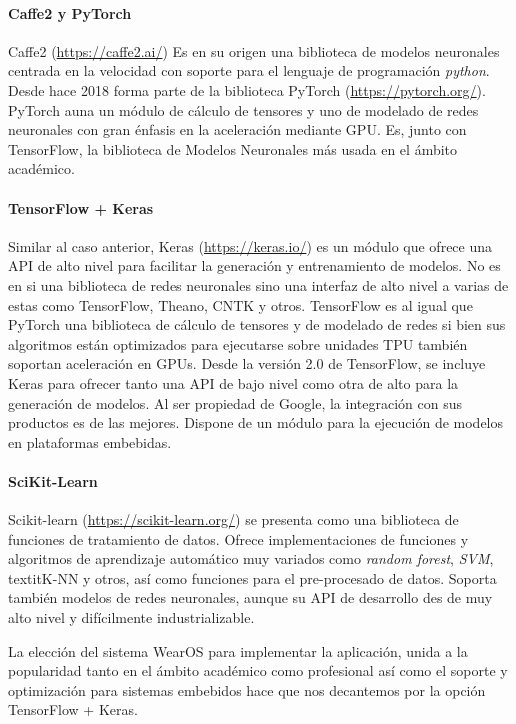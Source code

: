 \paragraph{Caffe2 y PyTorch}

Caffe2 (\url{https://caffe2.ai/}) Es en su origen una biblioteca de modelos neuronales centrada en la velocidad con soporte para el lenguaje de programación \textit{python}. Desde hace 2018 forma parte de la biblioteca PyTorch (\url{https://pytorch.org/}). PyTorch auna un módulo de cálculo de tensores y uno de modelado de redes neuronales con gran énfasis en la aceleración mediante GPU. Es, junto con TensorFlow, la biblioteca de Modelos Neuronales más usada en el ámbito académico.

\paragraph{TensorFlow + Keras}

Similar al caso anterior, Keras (\url{https://keras.io/}) es un módulo que ofrece una API de alto nivel para facilitar la generación y entrenamiento de modelos. No es en si una biblioteca de redes neuronales sino una interfaz de alto nivel a varias de estas como TensorFlow, Theano, CNTK y otros. TensorFlow es al igual que PyTorch una biblioteca de cálculo de tensores y de modelado de redes si bien sus algoritmos están optimizados para ejecutarse sobre unidades TPU también soportan aceleración en GPUs. Desde la versión 2.0 de TensorFlow, se incluye Keras para ofrecer tanto una API de bajo nivel como otra de alto para la generación de modelos. Al ser propiedad de Google, la integración con sus productos es de las mejores. Dispone de un módulo para la ejecución de modelos en plataformas embebidas.

\paragraph{SciKit-Learn}

Scikit-learn (\url{https://scikit-learn.org/}) se presenta como una biblioteca de funciones de tratamiento de datos. Ofrece implementaciones de funciones y algoritmos de aprendizaje automático muy variados como \textit{random forest}, \textit{SVM}, textit{K-NN} y otros, así como funciones para el pre-procesado de datos. Soporta también modelos de redes neuronales, aunque su API de desarrollo des de muy alto nivel y difícilmente industrializable.

La elección del sistema WearOS para implementar la aplicación, unida a la popularidad tanto en el ámbito académico como profesional así como el soporte y optimización para sistemas embebidos hace que nos decantemos por la opción TensorFlow + Keras.

